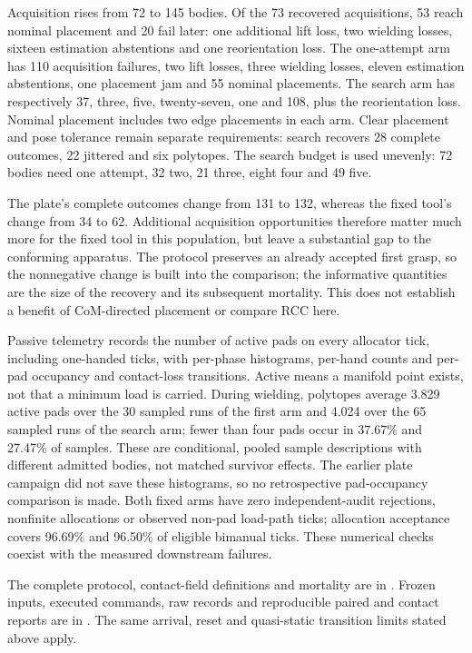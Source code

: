 Acquisition rises from 72 to 145 bodies. Of the 73 recovered acquisitions, 53 reach nominal placement and 20 fail later: one additional lift loss, two wielding losses, sixteen estimation abstentions and one reorientation loss. The one-attempt arm has 110 acquisition failures, two lift losses, three wielding losses, eleven estimation abstentions, one placement jam and 55 nominal placements. The search arm has respectively 37, three, five, twenty-seven, one and 108, plus the reorientation loss. Nominal placement includes two edge placements in each arm. Clear placement and pose tolerance remain separate requirements: search recovers 28 complete outcomes, 22 jittered and six polytopes. The search budget is used unevenly: 72 bodies need one attempt, 32 two, 21 three, eight four and 49 five.

The plate's complete outcomes change from 131 to 132, whereas the fixed tool's change from 34 to 62. Additional acquisition opportunities therefore matter much more for the fixed tool in this population, but leave a substantial gap to the conforming apparatus. The protocol preserves an already accepted first grasp, so the nonnegative change is built into the comparison; the informative quantities are the size of the recovery and its subsequent mortality. This does not establish a benefit of CoM-directed placement or compare RCC here.

Passive telemetry records the number of active pads on every allocator tick, including one-handed ticks, with per-phase histograms, per-hand counts and per-pad occupancy and contact-loss transitions. Active means a manifold point exists, not that a minimum load is carried. During wielding, polytopes average 3.829 active pads over the 30 sampled runs of the first arm and 4.024 over the 65 sampled runs of the search arm; fewer than four pads occur in 37.67\% and 27.47\% of samples. These are conditional, pooled sample descriptions with different admitted bodies, not matched survivor effects. The earlier plate campaign did not save these histograms, so no retrospective pad-occupancy comparison is made. Both fixed arms have zero independent-audit rejections, nonfinite allocations or observed non-pad load-path ticks; allocation acceptance covers 96.69\% and 96.50\% of eligible bimanual ticks. These numerical checks coexist with the measured downstream failures.

The complete protocol, contact-field definitions and mortality are in . Frozen inputs, executed commands, raw records and reproducible paired and contact reports are in . The same arrival, reset and quasi-static transition limits stated above apply.

